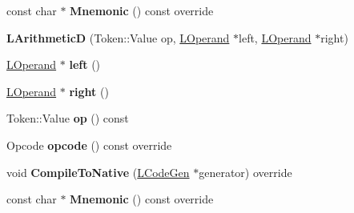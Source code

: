 \begin{DoxyCompactItemize}
\item 
const char $\ast$ {\bfseries Mnemonic} () const  override\hypertarget{classv8_1_1internal_1_1_l_arithmetic_d_a401c29ddc6c8aa2dc41d23d4be14aff7}{}\label{classv8_1_1internal_1_1_l_arithmetic_d_a401c29ddc6c8aa2dc41d23d4be14aff7}

\item 
{\bfseries L\+ArithmeticD} (Token\+::\+Value op, \hyperlink{classv8_1_1internal_1_1_l_operand}{L\+Operand} $\ast$left, \hyperlink{classv8_1_1internal_1_1_l_operand}{L\+Operand} $\ast$right)\hypertarget{classv8_1_1internal_1_1_l_arithmetic_d_aad5c45947dcad72abbbcd55b081f4e6e}{}\label{classv8_1_1internal_1_1_l_arithmetic_d_aad5c45947dcad72abbbcd55b081f4e6e}

\item 
\hyperlink{classv8_1_1internal_1_1_l_operand}{L\+Operand} $\ast$ {\bfseries left} ()\hypertarget{classv8_1_1internal_1_1_l_arithmetic_d_a8d143eb5deb9725b2544b7ecc1a6b7aa}{}\label{classv8_1_1internal_1_1_l_arithmetic_d_a8d143eb5deb9725b2544b7ecc1a6b7aa}

\item 
\hyperlink{classv8_1_1internal_1_1_l_operand}{L\+Operand} $\ast$ {\bfseries right} ()\hypertarget{classv8_1_1internal_1_1_l_arithmetic_d_ad78701fa7af5138fc5a741a1ceed96a7}{}\label{classv8_1_1internal_1_1_l_arithmetic_d_ad78701fa7af5138fc5a741a1ceed96a7}

\item 
Token\+::\+Value {\bfseries op} () const \hypertarget{classv8_1_1internal_1_1_l_arithmetic_d_a0689ba0a4deee0bb4450bb0fdc7f877b}{}\label{classv8_1_1internal_1_1_l_arithmetic_d_a0689ba0a4deee0bb4450bb0fdc7f877b}

\item 
Opcode {\bfseries opcode} () const  override\hypertarget{classv8_1_1internal_1_1_l_arithmetic_d_a6371d86c37944a1a90b2e4778d0b7024}{}\label{classv8_1_1internal_1_1_l_arithmetic_d_a6371d86c37944a1a90b2e4778d0b7024}

\item 
void {\bfseries Compile\+To\+Native} (\hyperlink{classv8_1_1internal_1_1_l_code_gen}{L\+Code\+Gen} $\ast$generator) override\hypertarget{classv8_1_1internal_1_1_l_arithmetic_d_a87834ef9f5e37f8ade4c8e8ef4284572}{}\label{classv8_1_1internal_1_1_l_arithmetic_d_a87834ef9f5e37f8ade4c8e8ef4284572}

\item 
const char $\ast$ {\bfseries Mnemonic} () const  override\hypertarget{classv8_1_1internal_1_1_l_arithmetic_d_a401c29ddc6c8aa2dc41d23d4be14aff7}{}\label{classv8_1_1internal_1_1_l_arithmetic_d_a401c29ddc6c8aa2dc41d23d4be14aff7}

\end{DoxyCompactItemize}
